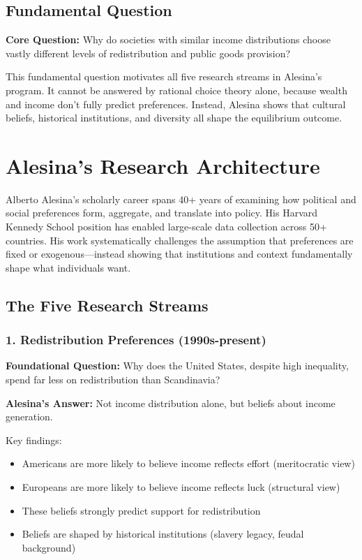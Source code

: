 \subsection{Fundamental Question}

\textbf{Core Question:} Why do societies with similar income distributions choose vastly different levels of redistribution and public goods provision?

This fundamental question motivates all five research streams in Alesina's program. It cannot be answered by rational choice theory alone, because wealth and income don't fully predict preferences. Instead, Alesina shows that cultural beliefs, historical institutions, and diversity all shape the equilibrium outcome.

\section{Alesina's Research Architecture}
\label{sec:alesina-overview}

Alberto Alesina's scholarly career spans 40+ years of examining how political and social preferences form, aggregate, and translate into policy. His Harvard Kennedy School position has enabled large-scale data collection across 50+ countries. His work systematically challenges the assumption that preferences are fixed or exogenous---instead showing that institutions and context fundamentally shape what individuals want.

\subsection{The Five Research Streams}

\subsubsection{1. Redistribution Preferences (1990s-present)}

\textbf{Foundational Question:} Why does the United States, despite high inequality, spend far less on redistribution than Scandinavia?

\textbf{Alesina's Answer:} Not income distribution alone, but beliefs about income generation.

Key findings:
\begin{itemize}
\item Americans are more likely to believe income reflects effort (meritocratic view)
\item Europeans are more likely to believe income reflects luck (structural view)
\item These beliefs strongly predict support for redistribution
\item Beliefs are shaped by historical institutions (slavery legacy, feudal background)
\end{itemize}


